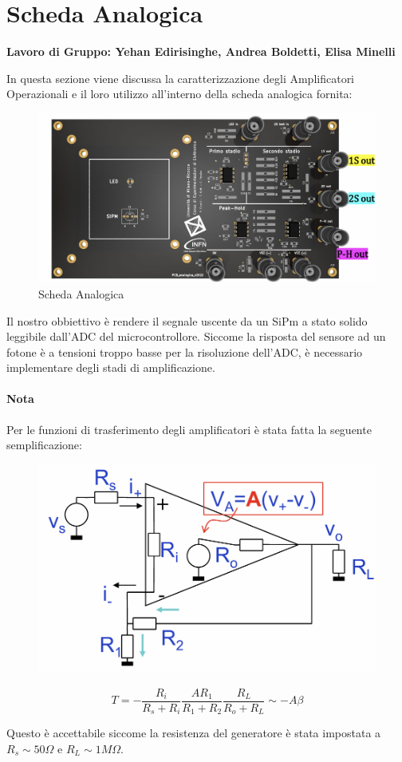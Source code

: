 \pagebreak
\section{Scheda Analogica}
\textbf{Lavoro di Gruppo:   Yehan Edirisinghe,  Andrea Boldetti,    Elisa Minelli}

In questa sezione viene discussa la caratterizzazione degli Amplificatori Operazionali e il loro utilizzo all'interno della scheda analogica fornita:

\begin{figure}[!h]
    \centering
    \includegraphics[width=0.5\linewidth]{assets/scheda analogica/Scheda_Analogica.png}
    \caption{Scheda Analogica}
\end{figure}

Il nostro obbiettivo è rendere il segnale uscente da un SiPm a stato solido leggibile dall'ADC del microcontrollore. Siccome la risposta del sensore ad un fotone è a tensioni troppo basse per la risoluzione dell'ADC, è necessario implementare degli stadi di amplificazione.

\paragraph{Nota}
Per le funzioni di trasferimento degli amplificatori è stata fatta la seguente semplificazione:

\begin{figure}[!h]
    \centering
    \includegraphics[width=0.5\linewidth]{assets/scheda analogica/T(s)_Approx.png}
    \label{fig:enter-label}
\end{figure}

\[ T = -\frac{R_i}{R_s + R_i} \frac{AR_1}{R_1 + R_2} \frac{R_L}{R_o+R_L} \sim -A\beta \]

Questo è accettabile siccome la resistenza del generatore è stata impostata a $R_s \sim 50\Omega$ e $R_L \sim 1M\Omega$.



\newpage



